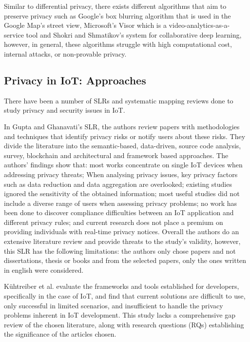 Similar to differential privacy, there exists different algorithms that aim to
preserve privacy such as Google's box blurring algorithm \cite{FromeLarge}
that is used in the Google Map's street view, Microsoft's Visor \cite{poddar2020visor}
which is a video-analytics-as-a-service tool and Shokri and Shmatikov's
\cite{ShokriPrivacy} system for collaborative deep learning, however, in
general, these algorithms struggle with high computational cost, internal
attacks, or non-provable privacy.

\subsection{Privacy in IoT: Approaches}

There have been a number of SLRs \cite{Gupta2022Privacy, Kuhtreiber2022survey, sicari2015security, LinSurvey, yang2022overview, zubaydi2023leveraging}
and systematic mapping reviews \cite{porras2018security, ahmed2019aspects}
done to study privacy and security issues in IoT.

In Gupta and Ghanavati's \cite{Gupta2022Privacy} SLR, the authors review
papers with methodologies and techniques that identify privacy risks or
notify users about these risks. They divide the literature into the semantic-based,
data-driven, source code analysis, survey, blockchain and architectural
and framework based approaches. The authors' findings show that: most works concentrate
on single IoT devices when addressing privacy threats; When analysing privacy
issues, key privacy factors such as data reduction and data aggregation
are overlooked; existing studies ignored the sensitivity of the obtained
information; most useful studies did not include a diverse range of users
when assessing privacy problems; no work has been done to discover compliance
difficulties between an IoT application and different privacy rules; and
current research does not place a premium on providing individuals with real-time
privacy notices. Overall the authors do an extensive literature review
and provide threats to the study's validity, however, this SLR has the
following limitations: the authors only chose papers and not dissertations,
thesis or books and from the selected papers, only the ones written in english
were considered.

Kühtreiber et al. \cite{Kuhtreiber2022survey} evaluate the frameworks and
tools established for developers, specifically in the case of IoT, and find
that current solutions are difficult to use, only successful in limited
scenarios, and insufficient to handle the privacy problems inherent in IoT
development. This study lacks a comprehensive gap review of the chosen
literature, along with research questions (RQs) establishing the significance
of the articles chosen.

